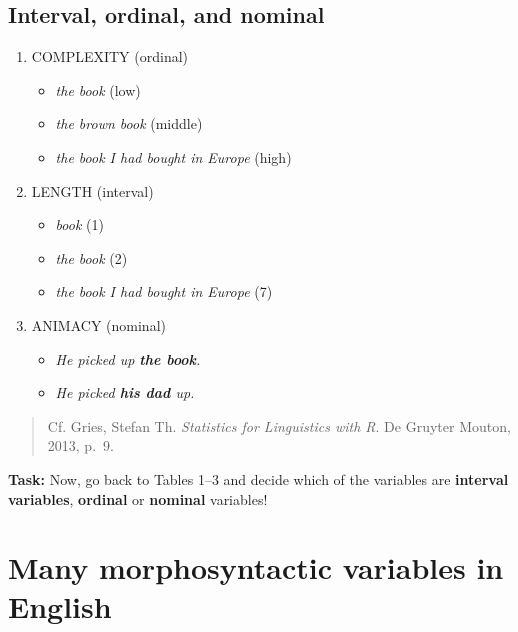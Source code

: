\documentclass[
  11pt,
  letterpaper,
  DIV=11,
  numbers=noendperiod]{scrreprt}
\providecommand{\tightlist}{%
  \setlength{\itemsep}{0pt}\setlength{\parskip}{0pt}}\usepackage{longtable,booktabs,array}
\begin{document}
\subsection{Interval, ordinal, and
nominal}\label{interval-ordinal-and-nominal}

\begin{enumerate}
\def\labelenumi{\arabic{enumi}.}
\tightlist
\item
  COMPLEXITY (ordinal)

  \begin{itemize}
  \tightlist
  \item
    \emph{the book} (low)
  \item
    \emph{the brown book} (middle)
  \item
    \emph{the book I had bought in Europe} (high)
  \end{itemize}
\item
  LENGTH (interval)

  \begin{itemize}
  \tightlist
  \item
    \emph{book} (1)
  \item
    \emph{the book} (2)
  \item
    \emph{the book I had bought in Europe} (7)
  \end{itemize}
\item
  ANIMACY (nominal)

  \begin{itemize}
  \tightlist
  \item
    \emph{He picked up \textbf{the book}.}
  \item
    \emph{He picked \textbf{his dad} up.}
  \end{itemize}
\end{enumerate}

\begin{quote}
Cf. Gries, Stefan Th. \emph{Statistics for Linguistics with R}. De
Gruyter Mouton, 2013, p.~9.
\end{quote}

\textbf{Task:} Now, go back to Tables 1--3 and decide which of the
variables are \textbf{interval variables}, \textbf{ordinal} or
\textbf{nominal} variables!

\section{Many morphosyntactic variables in
English}\label{many-morphosyntactic-variables-in-english}
\end{document}
